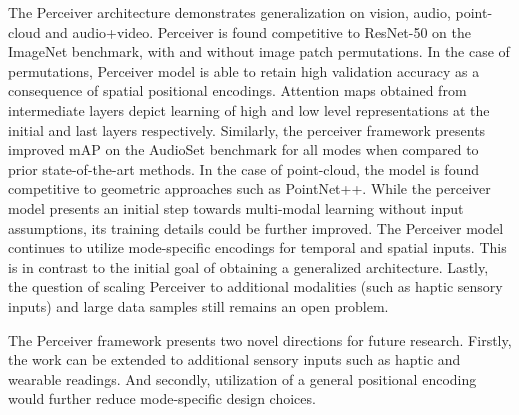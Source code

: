 \documentclass[11pt,letterpaper]{article}
\begin{document}
The Perceiver architecture demonstrates generalization on vision, audio, point-cloud and audio+video. Perceiver is found competitive to ResNet-50 on the ImageNet benchmark, with and without image patch permutations. In the case of permutations, Perceiver model is able to retain high validation accuracy as a consequence of spatial positional encodings. Attention maps obtained from intermediate layers depict learning of high and low level representations at the initial and last layers respectively. Similarly, the perceiver framework presents improved mAP on the AudioSet benchmark for all modes when compared to prior state-of-the-art methods. In the case of point-cloud, the model is found competitive to geometric approaches such as PointNet++. While the perceiver model presents an initial step towards multi-modal learning without input assumptions, its training details could be further improved. The Perceiver model continues to utilize mode-specific encodings for temporal and spatial inputs. This is in contrast to the initial goal of obtaining a generalized architecture. Lastly, the question of scaling Perceiver to additional modalities (such as haptic sensory inputs) and large data samples still remains an open problem.

The Perceiver framework presents two novel directions for future research. Firstly, the work can be extended to additional sensory inputs such as haptic and wearable readings. And secondly, utilization of a general positional encoding would further reduce mode-specific design choices. 
\end{document}
